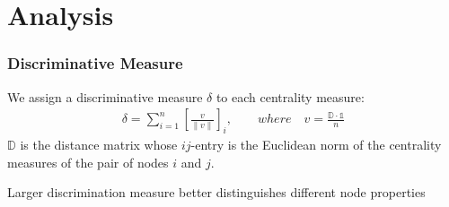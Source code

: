 \documentclass{beamer}
\begin{document}
\section{Analysis}

\begin{frame}
     \frametitle{Discriminative Measure}
We assign a discriminative measure $\delta$ to each centrality measure:
\begin{align*}
      \delta=\sum_{i=1}^n \left[ \frac{v}{\parallel v\parallel} \right]_i,   \qquad where \quad v = \frac {\mathbb{D} \cdot \mathds{1}}{n}
     \end{align*}
$\mathbb{D}$ is the distance matrix whose $ij$-entry is the Euclidean norm of the centrality measures of the pair of nodes $i$ and $j$.\\
\vspace{5mm}

Larger discrimination measure better distinguishes different node properties

\end{frame}
\end{document}
